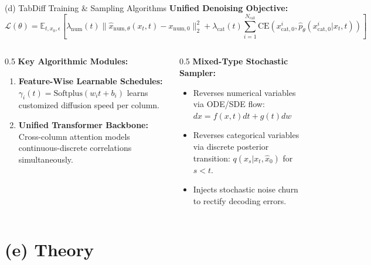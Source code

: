 \documentclass[aspectratio=169, 10pt]{beamer}
\begin{document}
\begin{frame}{(d) TabDiff Training & Sampling Algorithms}
  \textbf{Unified Denoising Objective:}
  $$\mathcal{L}(\theta) = \mathbb{E}_{t, x_0, \epsilon}\left[ \lambda_{\text{num}}(t) \| \hat{x}_{\text{num}, \theta}(x_t, t) - x_{\text{num}, 0} \|^2_2 + \lambda_{\text{cat}}(t) \sum_{i=1}^{N_{\text{cat}}} \text{CE}\left(x_{\text{cat}, 0}^i, \hat{p}_{\theta}(x_{\text{cat}, 0}^i | x_t, t)\right) \right]$$
  
  \begin{columns}
    \begin{column}{0.5\textwidth}
      \textbf{Key Algorithmic Modules:}
      \begin{enumerate}
        \item \textbf{Feature-Wise Learnable Schedules:}
          $\gamma_i(t) = \text{Softplus}(w_i t + b_i)$ learns customized diffusion speed per column.
        \item \textbf{Unified Transformer Backbone:}
          Cross-column attention models continuous-discrete correlations simultaneously.
      \end{enumerate}
    \end{column}
    \begin{column}{0.5\textwidth}
      \textbf{Mixed-Type Stochastic Sampler:}
      \begin{itemize}
        \item Reverses numerical variables via ODE/SDE flow:
          $dx = f(x, t)dt + g(t)dw$
        \item Reverses categorical variables via discrete posterior transition:
          $q(x_{s} | x_t, \hat{x}_0)$ for $s < t$.
        \item Injects stochastic noise churn to rectify decoding errors.
      \end{itemize}
    \end{column}
  \end{columns}
\end{frame}

\section{(e) Theory}
\end{document}
